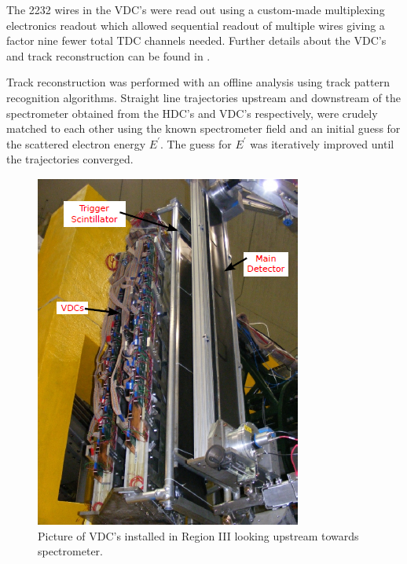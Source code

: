 The 2232 wires in the VDC's were read out using a custom-made multiplexing electronics readout which allowed sequential readout of multiple wires giving a factor nine fewer total TDC channels needed. Further details about the VDC's and track reconstruction can be found in \cite{Leckey2012}.

Track reconstruction was performed with an offline analysis using track pattern recognition algorithms. Straight line trajectories upstream and downstream of the spectrometer obtained from the HDC's and VDC's respectively, were crudely matched to each other using the known spectrometer field and an initial guess for the scattered electron energy $E^{\prime}$.  The guess for  $E^{\prime}$ was iteratively improved until the trajectories converged.
\begin{figure}[ht]
\centering
\includegraphics{Pictures/vdcs.png}
\caption{Picture of VDC's installed in Region III looking upstream towards spectrometer.}
\label{fig:vdcs}
\end{figure}
